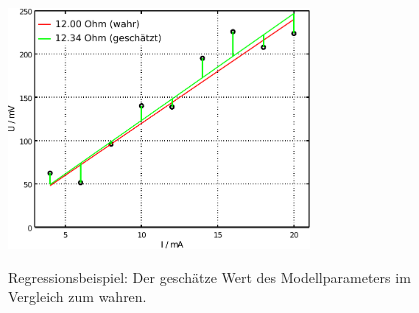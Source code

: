 \documentclass[a4paper,12pt,DIV=15]{scrartcl}
\begin{document}
\begin{figure}
\begin{center}
\includegraphics[width=80mm]{media/learn_estimation_ohm_esti.pdf}
\label{OhmResult}
\caption{Regressionsbeispiel: Der geschätze Wert des Modellparameters im Vergleich zum wahren.}
\end{center}
\end{figure}
\end{document}
